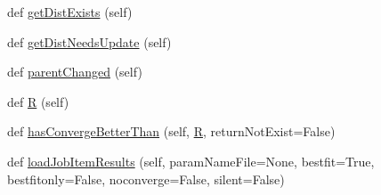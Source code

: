 \begin{DoxyCompactItemize}
def \mbox{\hyperlink{classparamgrid_1_1batchjob_1_1jobItem_aaee158d49404d612429bb2b9fbc9f5cf}{get\+Dist\+Exists}} (self)
\item 
def \mbox{\hyperlink{classparamgrid_1_1batchjob_1_1jobItem_a34d9ff5d01cecc89dcd1ce1a2d71a63e}{get\+Dist\+Needs\+Update}} (self)
\item 
def \mbox{\hyperlink{classparamgrid_1_1batchjob_1_1jobItem_a324b9ccf7caf3955d49e423da96c6c8c}{parent\+Changed}} (self)
\item 
def \mbox{\hyperlink{classparamgrid_1_1batchjob_1_1jobItem_aae8ea692f441626dcdebd9c9fbf687e7}{R}} (self)
\item 
def \mbox{\hyperlink{classparamgrid_1_1batchjob_1_1jobItem_a3cb0464ed8b1746556b0cfdb513f6fa4}{has\+Converge\+Better\+Than}} (self, \mbox{\hyperlink{classparamgrid_1_1batchjob_1_1jobItem_aae8ea692f441626dcdebd9c9fbf687e7}{R}}, return\+Not\+Exist=False)
\item 
def \mbox{\hyperlink{classparamgrid_1_1batchjob_1_1jobItem_aaabde0e3c21736a40d11c0b3df905192}{load\+Job\+Item\+Results}} (self, param\+Name\+File=None, bestfit=True, bestfitonly=False, noconverge=False, silent=False)
\end{DoxyCompactItemize}
